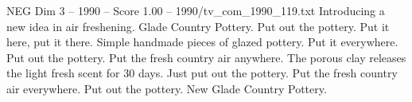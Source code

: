 \begin{textsample}{NEG Dim 3 – 1990 – Score 1.00 – 1990/tv\_com\_1990\_119.txt}  \label{ex:f3_neg_030}
Introducing a new idea in air freshening.
Glade Country Pottery.
Put out the pottery.
Put it here, put it there.
Simple handmade pieces of glazed pottery.
Put it everywhere.
Put out the pottery.
Put the fresh country air anywhere.
The porous clay releases the light fresh scent for 30 days.
Just put out the pottery.
Put the fresh country air everywhere.
Put out the pottery.
New Glade Country Pottery.

\end{textsample}
